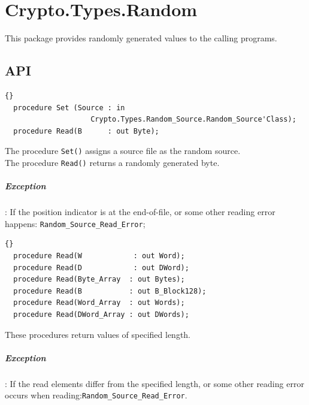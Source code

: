 \chapter{Crypto.Types.Random}
This package provides randomly generated values to the calling programs.
\section{API}\label{Read}
\begin{lstlisting}{}
  procedure Set (Source : in
               		Crypto.Types.Random_Source.Random_Source'Class);
  procedure Read(B      : out Byte);
\end{lstlisting}
The procedure \texttt{Set()} assigns a source file as the random
source.\\

The procedure \texttt{Read()} returns a randomly generated
byte.

\paragraph{Exception}: If the position indicator is at the end-of-file,
or some other reading error happens: \quad
\texttt{Random\_Source\_Read\_Error};

\begin{lstlisting}{}
  procedure Read(W 			  : out Word);
  procedure Read(D 			  : out DWord);
  procedure Read(Byte_Array  : out Bytes);
  procedure Read(B           : out B_Block128);
  procedure Read(Word_Array  : out Words);
  procedure Read(DWord_Array : out DWords);
\end{lstlisting}
These procedures return values of specified
length.

\paragraph{Exception}: If the read elements differ from the specified
length, or some other reading error occurs when
reading:\quad\texttt{Random\_Source\_Read\_Error}.



